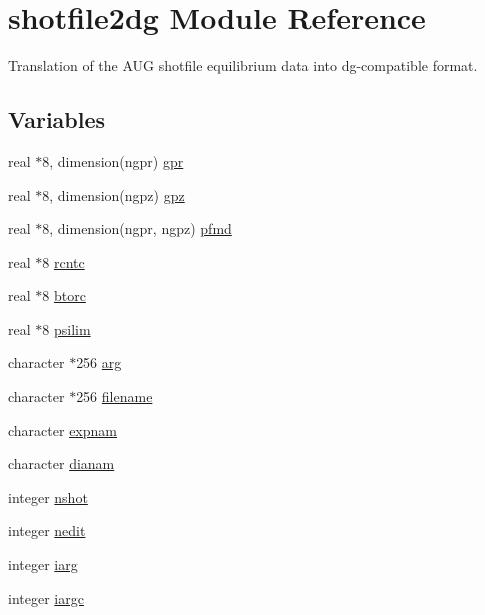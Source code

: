 \hypertarget{namespaceshotfile2dg}{
\section{shotfile2dg Module Reference}
\label{namespaceshotfile2dg}
}
Translation of the AUG shotfile equilibrium data into dg-compatible format.  


\subsection*{Variables}
\begin{CompactItemize}
\item 
real $\ast$8, dimension(ngpr) \hyperlink{namespaceshotfile2dg_c50fc1ef94233e32cc1a55c910fd9037}{gpr}
\item 
real $\ast$8, dimension(ngpz) \hyperlink{namespaceshotfile2dg_4175f5215674a1c9bade7bf6ba900feb}{gpz}
\item 
real $\ast$8, dimension(ngpr, ngpz) \hyperlink{namespaceshotfile2dg_244c205e85803307a067220a9149a277}{pfmd}
\item 
real $\ast$8 \hyperlink{namespaceshotfile2dg_519caa04c862ac70905e9cb264d156b0}{rcntc}
\item 
real $\ast$8 \hyperlink{namespaceshotfile2dg_86c17dafb5ef893787c9df16f528735b}{btorc}
\item 
real $\ast$8 \hyperlink{namespaceshotfile2dg_3d5fc7ba6a17fbbe538f7c4d2b3138cc}{psilim}
\item 
character $\ast$256 \hyperlink{namespaceshotfile2dg_b698b727537e2ab7d94d5ec0c44b62f6}{arg}
\item 
character $\ast$256 \hyperlink{namespaceshotfile2dg_a8cbd5f464c93ce3054f69959f54f24f}{filename}
\item 
character \hyperlink{namespaceshotfile2dg_035718019994ef0564c4ef1e6fbe1477}{expnam}
\item 
character \hyperlink{namespaceshotfile2dg_1c6b6dc13c91c970234997299500e842}{dianam}
\item 
integer \hyperlink{namespaceshotfile2dg_e24378204407e119ddc87122265ea324}{nshot}
\item 
integer \hyperlink{namespaceshotfile2dg_aba5c8cf053397dddeded69b88f887e2}{nedit}
\item 
integer \hyperlink{namespaceshotfile2dg_5c10817ab16ac4db9ccc26ac2ce08d88}{iarg}
\item 
integer \hyperlink{namespaceshotfile2dg_ac2982c024cdf54d82169a44531a3e7f}{iargc}
\item 

\end{CompactItemize}
